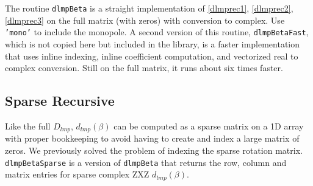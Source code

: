 The routine \texttt{dlmpBeta} is a straight implementation of \eqref{dlmprec1}, \eqref{dlmprec2}, \eqref{dlmprec3} on the full matrix (with zeros) with conversion to complex.  Use \texttt{'mono'} to include the monopole. A second version of this routine, \texttt{dlmpBetaFast}, which is not copied here but included in the library, is a faster implementation that uses inline indexing, inline coefficient computation, and vectorized real to complex conversion. Still on the full matrix, it runs about six times faster.

{\footnotesize
{}
}

\subsection{Sparse Recursive}
Like the full $D_{lmp}$, $d_{lmp}(\beta)$ can be computed as a sparse matrix on a 1D array with proper bookkeeping to avoid having to create and index a large matrix of zeros.  We previously solved the problem of indexing the sparse rotation matrix.  \texttt{dlmpBetaSparse} is a version of \texttt{dlmpBeta} that returns the row, column and matrix entries for sparse complex ZXZ $d_{lmp}(\beta)$.  

{\footnotesize
{}
}


%
%
%
%
%

